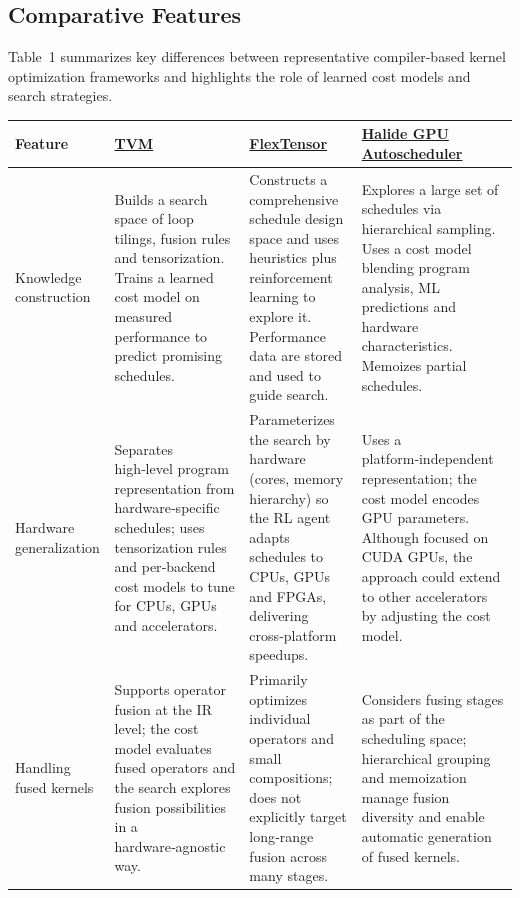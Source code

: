 \documentclass{article}
\begin{document}
\subsection{Comparative Features}
Table~1 summarizes key differences between representative compiler-based kernel optimization frameworks and highlights the role of learned cost models and search strategies.\newline

\begin{table}[H]
\centering
\begin{tabular}{|
  >{\raggedright\arraybackslash}m{3.2cm}|
  >{\raggedright\arraybackslash}m{3.8cm}|
  >{\raggedright\arraybackslash}m{3.8cm}|
  >{\raggedright\arraybackslash}m{3.8cm}|}
\hline
\textbf{Feature} &
\href{https://www.usenix.org/system/files/osdi18-chen.pdf}{\textbf{TVM}} &
\href{https://ceca.pku.edu.cn/docs/20200915213803856105.pdf}{\textbf{FlexTensor}} &
\href{https://cseweb.ucsd.edu/~tzli/gpu_autoscheduler.pdf}{\textbf{Halide GPU Autoscheduler}}\\
\hline
Knowledge construction &
Builds a search space of loop tilings, fusion rules and tensorization. Trains a learned cost model on measured performance to predict promising schedules. &
Constructs a comprehensive schedule design space and uses heuristics plus reinforcement learning to explore it. Performance data are stored and used to guide search. &
Explores a large set of schedules via hierarchical sampling. Uses a cost model blending program analysis, ML predictions and hardware characteristics. Memoizes partial schedules.\\
\hline
Hardware generalization &
Separates high‑level program representation from hardware‑specific schedules; uses tensorization rules and per‑backend cost models to tune for CPUs, GPUs and accelerators. &
Parameterizes the search by hardware (cores, memory hierarchy) so the RL agent adapts schedules to CPUs, GPUs and FPGAs, delivering cross‑platform speedups. &
Uses a platform‑independent representation; the cost model encodes GPU parameters. Although focused on CUDA GPUs, the approach could extend to other accelerators by adjusting the cost model.\\
\hline
Handling fused kernels &
Supports operator fusion at the IR level; the cost model evaluates fused operators and the search explores fusion possibilities in a hardware‑agnostic way. &
Primarily optimizes individual operators and small compositions; does not explicitly target long‑range fusion across many stages. &
Considers fusing stages as part of the scheduling space; hierarchical grouping and memoization manage fusion diversity and enable automatic generation of fused kernels.\\
\hline
\end{tabular}
\end{table}
\end{document}
